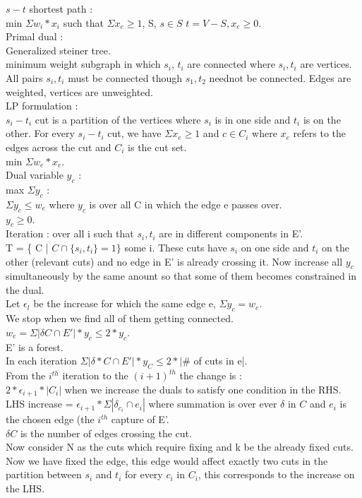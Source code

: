 \documentclass[solution,addpoints,12pt]{exam}
\begin{document}
$s-t$ shortest path :\\
min $\Sigma w_i*x_i$ such that $\Sigma x_e \ge 1$, S, $s \in S$
$t = V-S, x_e \ge 0$.\\

Primal dual :\\
Generalized steiner tree.\\
minimum weight subgraph in which $s_i$, $t_i$ are connected where $s_i, t_i$
are vertices. All pairs $s_i, t_i$ must be connected though $s_1, t_2$ neednot be connected.
Edges are weighted, vertices are unweighted.\\

LP formulation :\\
$s_i-t_i$ cut is a partition of the vertices where $s_i$ is in one side
and $t_i$ is on the other. For every $s_i-t_i$ cut, we have $\Sigma x_e \ge 1$
and $c \in C_i$ where $x_e$ refers to the edges across the cut and $C_i$ is the cut set.\\
min $\Sigma w_e*x_e$.\\

Dual variable $y_c$ :\\
max $\Sigma y_c$ :\\
$\Sigma y_c \le w_e$ where $y_c$ is over all C in which the edge e passes over.\\
$y_c \ge 0$.\\
Iteration : over all i such that $s_i, t_i$ are in different components in E'.\\
T = \{ C | $C \cap \{s_i, t_i\} = 1\}$ some i. These cuts have $s_i$ on one
side and $t_i$ on the other (relevant cuts) and no edge
in E' is already crossing it. Now increase all $y_c$
simultaneously by the same anount so that some of them becomes constrained in the dual.\\

Let $\epsilon_l$ be the increase for which the same edge e, $\Sigma y_c = w_e$.\\
We stop when we find all of them getting connected.\\

$w_e = \Sigma |\delta C \cap E'|*y_c \le 2*y_c$.\\

E' is a forest.\\
In each iteration $\Sigma |\delta*C \cap E'|*y_C \le 2*|\#$ of cuts in e|.\\
From the $i^{th}$ iteration to the ${(i+1)}^{th}$ the change is :\\
$2*\epsilon_{i+1}*|C_i|$ when we increase the duals to satisfy one condition in
the RHS.\\
LHS increase = $\epsilon_{i+1}*\Sigma|\delta_{c_i} \cap e_i|$ where
summation is over ever $\delta$ in $C$ and $e_i$ is the chosen edge (the
$i^{th}$ capture of E'.\\
$\delta C$ is the number of edges crossing the cut.\\
Now consider N as the cuts which require fixing and k be the
already fixed cuts. Now we have fixed the edge, this edge would affect
exactly two cuts in the partition between $s_i$ and $t_i$ for
every $c_i$ in $C_i$, this corresponds to the increase on the LHS.\\
\end{document}
